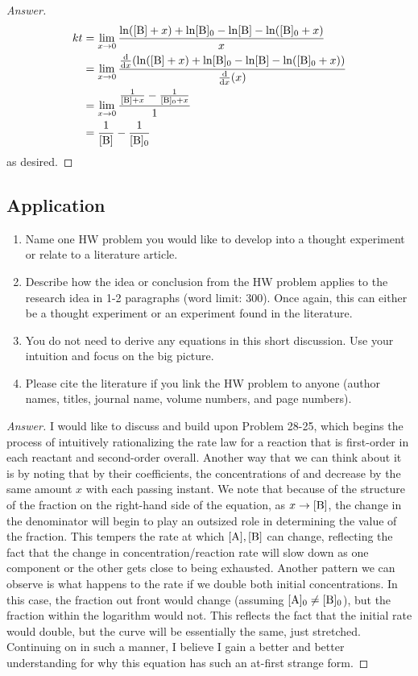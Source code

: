 \documentclass[../psets.tex]{subfiles}
\begin{document}
\begin{enumerate}[label={\textbf{28-\arabic*.}},leftmargin=3.5em]
\begin{proof}[Answer]
\begin{align*}
            kt &= \lim_{x\to 0}\frac{\ln([\ce{B}]+x)+\ln[\ce{B}]_0-\ln[\ce{B}]-\ln([\ce{B}]_0+x)}{x}\\
            &= \lim_{x\to 0}\frac{\dv{x}(\ln([\ce{B}]+x)+\ln[\ce{B}]_0-\ln[\ce{B}]-\ln([\ce{B}]_0+x))}{\dv{x}(x)}\\
            &= \lim_{x\to 0}\frac{\frac{1}{[\ce{B}]+x}-\frac{1}{[\ce{B}]_0+x}}{1}\\
            &= \frac{1}{[\ce{B}]}-\frac{1}{[\ce{B}]_0}
        \end{align*}
        as desired.
    \end{proof}
\end{enumerate}


\subsection*{Application}
\begin{enumerate}[label={\arabic*)}]
    \item Name one HW problem you would like to develop into a thought experiment or relate to a literature article.
    \item Describe how the idea or conclusion from the HW problem applies to the research idea in 1-2 paragraphs (word limit: 300). Once again, this can either be a thought experiment or an experiment found in the literature.
    \item You do not need to derive any equations in this short discussion. Use your intuition and focus on the big picture.
    \item Please cite the literature if you link the HW problem to anyone (author names, titles, journal name, volume numbers, and page numbers).
\end{enumerate}
\begin{proof}[Answer]
    I would like to discuss and build upon Problem 28-25, which begins the process of intuitively rationalizing the rate law for a reaction that is first-order in each reactant and second-order overall. Another way that we can think about it is by noting that by their coefficients, the concentrations of  and  decrease by the same amount $x$ with each passing instant. We note that because of the structure of the fraction on the right-hand side of the equation, as $x\to[\ce{B}]$, the change in the denominator will begin to play an outsized role in determining the value of the fraction. This tempers the rate at which $[\ce{A}],[\ce{B}]$ can change, reflecting the fact that the change in concentration/reaction rate will slow down as one component or the other gets close to being exhausted. Another pattern we can observe is what happens to the rate if we double both initial concentrations. In this case, the fraction out front would change (assuming $[\ce{A}]_0\neq[\ce{B}]_0$), but the fraction within the logarithm would not. This reflects the fact that the initial rate would double, but the curve will be essentially the same, just stretched. Continuing on in such a manner, I believe I gain a better and better understanding for why this equation has such an at-first strange form.
\end{proof}
\setcounter{equation}{0}
\end{document}

